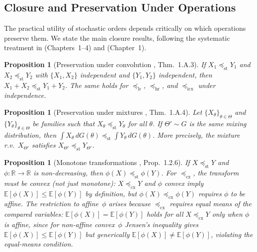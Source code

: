 \documentclass[11pt,a4paper]{article}
\theoremstyle{plain}
\newtheorem{proposition}[theorem]{Proposition}
\theoremstyle{definition}
\theoremstyle{remark}
\begin{document}
\subsection{Closure and Preservation Under Operations}
\label{sec:micro:closure}

The practical utility of stochastic orders depends critically on which operations
preserve them.  We state the main closure results, following the systematic treatment
in \cite{shaked2007} (Chapters~1--4) and \cite{muller2002}
(Chapter~1).

\begin{proposition}[Preservation under convolution {\cite{shaked2007}, Thm.~1.A.3}]
\label{prop:conv}
If $X_1 \preceq_{\mathrm{st}} Y_1$ and $X_2 \preceq_{\mathrm{st}} Y_2$ with
$\{X_1, X_2\}$ independent and $\{Y_1, Y_2\}$ independent, then
$X_1 + X_2 \preceq_{\mathrm{st}} Y_1 + Y_2$.
The same holds for $\preceq_{\mathrm{lr}}$, $\preceq_{\mathrm{hr}}$,
and $\preceq_{\mathrm{icx}}$ under independence.
\end{proposition}

\begin{proposition}[Preservation under mixtures {\cite{shaked2007}, Thm.~1.A.4}]
\label{prop:mixture}
Let $\{X_\theta\}_{\theta \in \Theta}$ and $\{Y_\theta\}_{\theta \in \Theta}$ be
families such that $X_\theta \preceq_{\mathrm{st}} Y_\theta$ for all $\theta$.
If $\Theta' \sim G$ is the same mixing distribution, then
$\int X_\theta\, dG(\theta) \preceq_{\mathrm{st}} \int Y_\theta\, dG(\theta)$.
More precisely, the mixture r.v.\ $X_{\Theta'}$ satisfies
$X_{\Theta'} \preceq_{\mathrm{st}} Y_{\Theta'}$.
\end{proposition}


\begin{proposition}[Monotone transformations {\cite{muller2002}, Prop.~1.2.6}]
\label{prop:monotone_transform}
If $X \preceq_{\mathrm{st}} Y$ and $\phi \colon \mathbb{R} \to \mathbb{R}$ is
non-decreasing, then $\phi(X) \preceq_{\mathrm{st}} \phi(Y)$.
For $\preceq_{\mathrm{cx}}$, the transform must be convex (not just monotone):
$X \preceq_{\mathrm{cx}} Y$ and $\phi$ convex imply
$\mathbb{E}[\phi(X)] \leq \mathbb{E}[\phi(Y)]$ by definition, but
$\phi(X) \preceq_{\mathrm{cx}} \phi(Y)$ requires $\phi$ to be affine.
The restriction to affine~$\phi$ arises because $\preceq_{\mathrm{cx}}$ requires
equal means of the compared variables: $\mathbb{E}[\phi(X)] = \mathbb{E}[\phi(Y)]$
holds for all $X \preceq_{\mathrm{cx}} Y$ only when $\phi$ is affine, since
for non-affine convex~$\phi$ Jensen's inequality gives
$\mathbb{E}[\phi(X)] \leq \mathbb{E}[\phi(Y)]$ but generically
$\mathbb{E}[\phi(X)] \neq \mathbb{E}[\phi(Y)]$, violating the equal-means condition.
\end{proposition}
\end{document}

